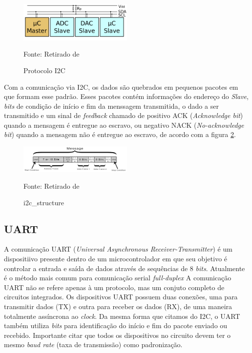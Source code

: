 \documentclass[../../layout.tex]{subfiles}
\begin{document}
\begin{figure}[H]
\centering
\caption{Protocolo I2C}
\includegraphics[width=0.5\textwidth]{assets/static/img/i2c.jpg}
\label{fig:i2c}

\begin{minipage}{0.5\textwidth}
\raggedright \footnotesize Fonte: Retirado de  
\end{minipage}
\end{figure}

\hspace*{3em}Com a comunicação via I2C, os dados são quebrados em pequenos pacotes em que formam esse padrão. Esses pacotes contém informações do endereço do \emph{Slave}, \emph{bits} de condição de início e fim da menssagem transmitida, o dado a ser transmitido e um sinal de \emph{feedback} chamado de positivo ACK (\emph{Acknowledge bit}) quando a mensagem é entregue ao escravo, ou negativo NACK (\emph{No-acknowledge bit}) quando a mensagem não é entregue ao escravo, de acordo com a figura \ref{fig:i2c_structure}.

\begin{figure}[H]
\centering
\caption{i2c_structure}
\includegraphics[width=0.5\textwidth]{assets/static/img/i2c_structure.jpg}
\label{fig:i2c_structure}

\begin{minipage}{0.5\textwidth}
\raggedright \footnotesize Fonte: Retirado de \cite{i2c_structure} 
\end{minipage}
\end{figure}

\subsection{UART}
\hspace*{3em}A comunicação UART (\emph{Universal Asynchronous Receiver-Transmitter}) é um dispositiivo presente dentro de um microcontrolador em que seu objetivo é controlar a entrada e saída de dados através de sequências de 8 \emph{bits}. Atualmente é o método mais comum para comunicação serial \emph{full-duplex} \cite{uart} A comunicação UART não se refere apenas à um protocolo, mas um conjuto completo de circuitos integrados. Os dispositivos UART possuem duas conexões, uma para transmitir dados (TX) e outra para receber os dados (RX), de uma maneira totalmente assíncrona ao \emph{clock}. Da mesma forma que citamos do I2C, o UART também utiliza \emph{bits} para identificação do início e fim do pacote enviado ou recebido. Importante citar que todos os dispositivos no circuito devem ter o mesmo \emph{baud rate} (taxa de transmissão) como padronização.
\end{document}
